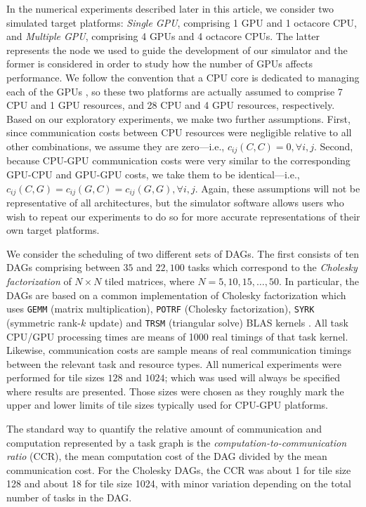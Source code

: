 \documentclass[runningheads]{llncs}
\begin{document}
In the numerical experiments described later in this article, we consider two simulated target platforms: {\em Single GPU}, comprising 1 GPU and 1 octacore CPU, and {\em Multiple GPU}, comprising 4 GPUs and 4 octacore CPUs. The latter represents the node we used to guide the development of our simulator and the former is considered in order to study how the number of GPUs affects performance. We follow the convention that a CPU core is dedicated to managing each of the GPUs \cite{augonnet2011starpu}, so these two platforms are actually assumed to comprise 7 CPU and 1 GPU resources, and 28 CPU and 4 GPU resources, respectively. Based on our exploratory experiments, we make two further assumptions. First, since communication costs between CPU resources were negligible relative to all other combinations, we assume they are zero---i.e., $c_{ij}(C, C) = 0, \forall i, j$. Second, because CPU-GPU communication costs were very similar to the corresponding GPU-CPU and GPU-GPU costs, we take them to be identical---i.e., $c_{ij}(C, G) = c_{ij}(G, C) = c_{ij}(G, G), \forall i, j$. Again, these assumptions will not be representative of all architectures, but the simulator software allows users who wish to repeat our experiments to do so for more accurate representations of their own target platforms. 

We consider the scheduling of two different sets of DAGs. The first consists of ten DAGs comprising between $35$ and $22,100$ tasks which correspond to the {\em Cholesky factorization} of $N \times N$ tiled matrices, where $N = 5, 10, 15, \dots, 50$. In particular, the DAGs are based on a common implementation of Cholesky factorization which uses {\tt GEMM} (matrix multiplication), {\tt POTRF} (Cholesky factorization), {\tt SYRK} (symmetric rank-$k$ update) and {\tt TRSM} (triangular solve) BLAS kernels \cite{Dongarra:1990:SLB:77626.79170}. All task CPU/GPU processing times are means of 1000 real timings of that task kernel. Likewise, communication costs are sample means of real communication timings between the relevant task and resource types. All numerical experiments were performed for tile sizes $128$ and $1024$; which was used will always be specified where results are presented. Those sizes were chosen as they roughly mark the upper and lower limits of tile sizes typically used for CPU-GPU platforms.

The standard way to quantify the relative amount of communication and computation represented by a task graph is the {\em computation-to-communication ratio} (CCR), the mean computation cost of the DAG divided by the mean communication cost. For the Cholesky DAGs, the CCR was about 1 for tile size 128 and about 18 for tile size 1024, with minor variation depending on the total number of tasks in the DAG. 
\end{document}
